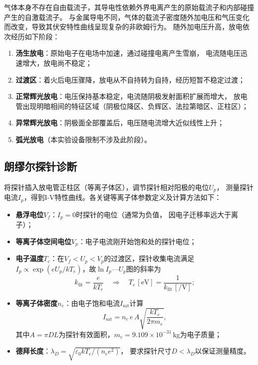 \documentclass[a4paper,8pt,twocolumn]{article}
\begin{document}
气体本身不存在自由载流子，其导电性依赖外界电离产生的原始载流子和内部碰撞产生的自激载流子。
与金属导电不同，气体的载流子密度随外加电压和气压变化而改变，导致其伏安特性曲线呈现复杂的非欧姆行为。
随外加电压升高，放电依次经历如下阶段：

\begin{enumerate}[label=(\alph*)]
  \item \textbf{汤生放电}：原始电子在电场中加速，通过碰撞电离产生雪崩，
        电流随电压迅速增大，放电尚不稳定；
  \item \textbf{过渡区}：着火后电压骤降，放电从不自持转为自持，经历短暂不稳定过渡；
  \item \textbf{正常辉光放电}：电压保持基本稳定，电流随阴极发射面积扩展而增大，
        放电管出现明暗相间的特征区域（阴极位降区、负辉区、法拉第暗区、正柱区）；
  \item \textbf{异常辉光放电}：阴极面全部覆盖后，电压随电流增大近似线性上升；
  \item \textbf{弧光放电}（本实验设备限制不涉及此阶段）。
\end{enumerate}

\subsection{朗缪尔探针诊断}

将探针插入放电管正柱区（等离子体区），调节探针相对阳极的电位$U_p$，
测量探针电流$I_p$，得到I-V特性曲线。各关键等离子体参数定义及计算方法如下：

\begin{itemize}
  \item \textbf{悬浮电位}$V_f$：$I_p=0$时探针的电位（通常为负值，
        因电子迁移率远大于离子）；
  \item \textbf{等离子体空间电位}$V_p$：电子电流刚开始饱和处的探针电位；
  \item \textbf{电子温度}$T_e$：在$V_f<U_p<V_p$的过渡区，探针收集电流满足
        $I_p\propto\exp(eU_p/kT_e)$，故$\ln I_p$—$U_p$图的斜率为
        \begin{equation}
          k_\text{fit}=\frac{e}{kT_e}
          \quad\Longrightarrow\quad
          T_e\,[\text{eV}]=\frac{1}{k_\text{fit}\,[\si{\per\volt}]};
          \tag{1}
        \end{equation}
  \item \textbf{等离子体密度}$n_e$：由电子饱和电流$I_\text{sat}$计算
        \begin{equation}
          I_\text{sat}=n_e\,e\,A\sqrt{\frac{kT_e}{2\pi m_e}},
          \tag{2}
        \end{equation}
        其中$A=\pi DL$为探针有效面积，$m_e=9.109\times10^{-31}$\,kg为电子质量；
  \item \textbf{德拜长度}：$\lambda_D=\sqrt{\varepsilon_0 kT_e/(n_e e^2)}$，
        要求探针尺寸$D<\lambda_D$以保证测量精度。
\end{itemize}
\end{document}
